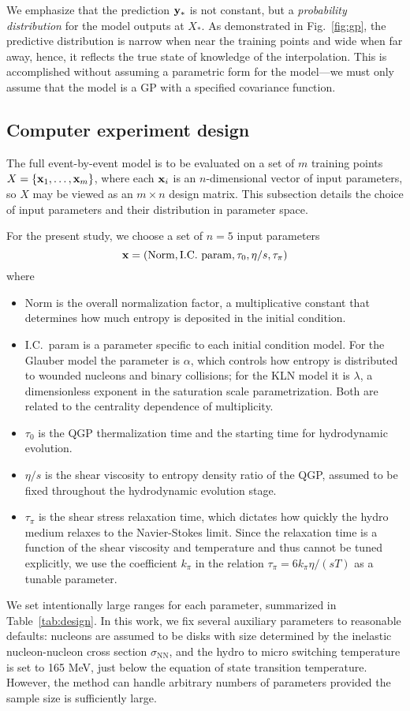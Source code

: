 \documentclass[aps,prc,reprint,superscriptaddress,amsmath]{revtex4-1}
\begin{document}
We emphasize that the prediction $\mathbf y_*$ is not constant, but a \emph{probability distribution} for the model outputs at $X_*$.
As demonstrated in Fig.~\ref{fig:gp}, the predictive distribution is narrow when near the training points and wide when far away, hence, it reflects the true state of knowledge of the interpolation.
This is accomplished without assuming a parametric form for the model---we must only assume that the model is a GP with a specified covariance function.


\subsection{Computer experiment design}

The full event-by-event model is to be evaluated on a set of $m$ training points $X = \{\mathbf x_1, \ldots, \mathbf x_m\}$, where each $\mathbf x_i$ is an $n$-dimensional vector of input parameters, so $X$ may be viewed as an $m \times n$ design matrix.
This subsection details the choice of input parameters and their distribution in parameter space.

For the present study, we choose a set of $n = 5$ input parameters
\begin{equation}
  \mathbf x = (\text{Norm}, \text{I.C.\ param}, \tau_0, \eta/s, \tau_\pi)
\end{equation}
where
\begin{itemize}
  \item Norm is the overall normalization factor, a multiplicative constant that determines how much entropy is deposited in the initial condition.
  \item I.C.\ param is a parameter specific to each initial condition model.
    For the Glauber model the parameter is $\alpha$, which controls how entropy is distributed to wounded nucleons and binary collisions;
    for the KLN model it is $\lambda$, a dimensionless exponent in the saturation scale parametrization.
    Both are related to the centrality dependence of multiplicity.
  \item $\tau_0$ is the QGP thermalization time and the starting time for hydrodynamic evolution.
  \item $\eta/s$ is the shear viscosity to entropy density ratio of the QGP, assumed to be fixed throughout the hydrodynamic evolution stage.
  \item $\tau_\pi$ is the shear stress relaxation time, which dictates how quickly the hydro medium relaxes to the Navier-Stokes limit.
    Since the relaxation time is a function of the shear viscosity and temperature and thus cannot be tuned explicitly, we use the coefficient $k_\pi$ in the relation $\tau_\pi = 6k_\pi\eta/(sT)$ as a tunable parameter.
\end{itemize}
We set intentionally large ranges for each parameter, summarized in Table~\ref{tab:design}.
In this work, we fix several auxiliary parameters to reasonable defaults:
nucleons are assumed to be disks with size determined by the inelastic nucleon-nucleon cross section $\sigma_\text{NN}$, and the hydro to micro switching temperature is set to 165 MeV, just below the equation of state transition temperature.
However, the method can handle arbitrary numbers of parameters provided the sample size is sufficiently large.
\end{document}
